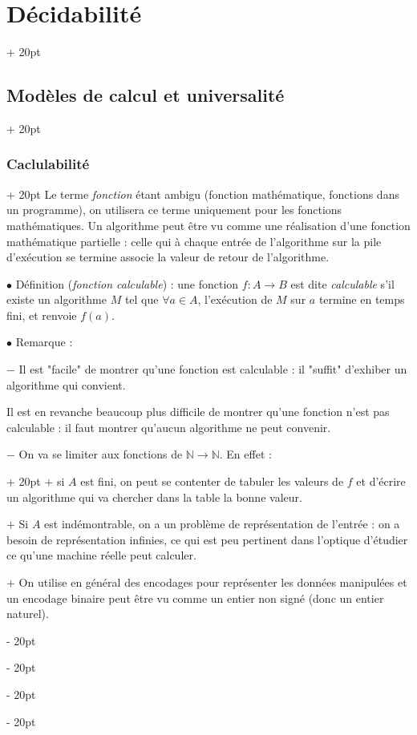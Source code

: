 \documentclass[a4paper, 12pt, twoside]{article}
\newcommand{\N}{\mathbb{N}} %
\newcommand{\ind}[1][20pt]{\advance\leftskip + #1}
\newcommand{\deind}[1][20pt]{\advance\leftskip - #1}
\newenvironment{indt}[2][20pt]{#2 \par \ind[#1]}{\par \deind} %
\begin{document}
\begin{indt}{\section{Décidabilité}}
\begin{indt}{\subsection{Modèles de calcul et universalité}}
\begin{indt}{\subsubsection{Caclulabilité}}
                Le terme \emph{fonction} étant ambigu (fonction mathématique, fonctions dans un programme), on utilisera ce terme uniquement pour les fonctions mathématiques. Un algorithme peut être vu comme une réalisation d'une fonction mathématique partielle : celle qui à chaque entrée de l'algorithme sur la pile d'exécution se termine associe la valeur de retour de l'algorithme.

                \vspace{12pt}
                
                $\bullet$ Définition (\emph{fonction calculable}) : une fonction $f : A \longrightarrow B$ est dite \emph{calculable} s'il existe un algorithme $M$ tel que $\forall a \in A$, l'exécution de $M$ sur $a$ termine en temps fini, et renvoie $f(a)$.

                \vspace{12pt}
                
                $\bullet$ Remarque :

                $-$ Il est "facile" de montrer qu'une fonction est calculable : il "suffit" d'exhiber un algorithme qui convient.

                Il est en revanche beaucoup plus difficile de montrer qu'une fonction n'est pas calculable : il faut montrer qu'aucun algorithme ne peut convenir.

                \vspace{6pt}
                
                \begin{indt}{$-$ On va se limiter aux fonctions de $\N \longrightarrow \N$. En effet :}
                    $+$ si $A$ est fini, on peut se contenter de tabuler les valeurs de $f$ et d'écrire un algorithme qui va chercher dans la table la bonne valeur.

                    $+$ Si $A$ est indémontrable, on a un problème de représentation de l'entrée : on a besoin de représentation infinies, ce qui est peu pertinent dans l'optique d'étudier ce qu'une machine réelle peut calculer.

                    $+$ On utilise en général des encodages pour représenter les données manipulées et un encodage binaire peut être vu comme un entier non signé (donc un entier naturel).
                \end{indt}

                \vspace{12pt}
                

\end{indt}
\end{indt}
\end{indt}
\end{document}
